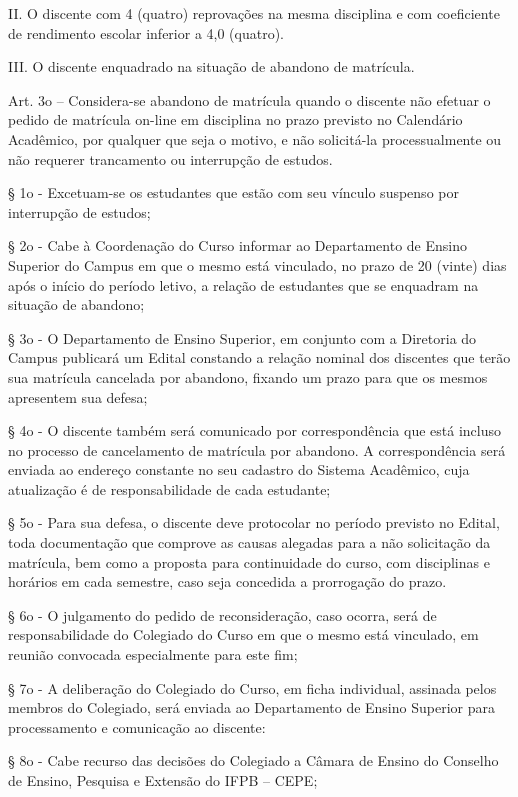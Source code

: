 II. O discente com 4 (quatro) reprovações na mesma disciplina e com coeficiente de rendimento escolar inferior a 4,0 (quatro).

III. O discente enquadrado na situação de abandono de matrícula.

Art. 3o – Considera-se abandono de matrícula quando o discente não efetuar o pedido de matrícula on-line em disciplina no prazo previsto no Calendário Acadêmico, por qualquer que seja o motivo, e não solicitá-la processualmente ou não requerer trancamento ou interrupção de estudos.

§ 1o - Excetuam-se os estudantes que estão com seu vínculo suspenso por interrupção de estudos;

§ 2o - Cabe à Coordenação do Curso informar ao Departamento de Ensino Superior do Campus em que o mesmo está vinculado, no prazo de 20 (vinte) dias após o início do período letivo, a relação de estudantes que se enquadram na situação de abandono;

§ 3o - O Departamento de Ensino Superior, em conjunto com a Diretoria do Campus publicará um Edital constando a relação nominal dos discentes que terão sua matrícula cancelada por abandono, fixando um prazo para que os mesmos apresentem sua defesa;

§ 4o - O discente também será comunicado por correspondência que está incluso no processo de cancelamento de matrícula por abandono. A correspondência será enviada ao endereço constante no seu cadastro do Sistema Acadêmico, cuja atualização é de responsabilidade de cada estudante;

§ 5o - Para sua defesa, o discente deve protocolar no período previsto no Edital, toda documentação que comprove as causas alegadas para a não solicitação da matrícula, bem como a proposta para continuidade do curso, com disciplinas e horários em cada semestre, caso seja concedida a prorrogação do prazo.

§ 6o - O julgamento do pedido de reconsideração, caso ocorra, será de responsabilidade do Colegiado do Curso em que o mesmo está vinculado, em reunião convocada especialmente para este fim;

§ 7o - A deliberação do Colegiado do Curso, em ficha individual, assinada pelos membros do Colegiado, será enviada ao Departamento de Ensino Superior para processamento e comunicação ao discente:

§ 8o - Cabe recurso das decisões do Colegiado a Câmara de Ensino do Conselho de Ensino, Pesquisa e Extensão do IFPB – CEPE;

